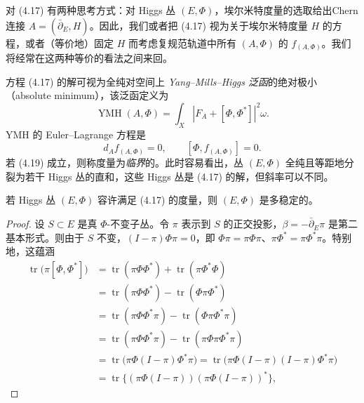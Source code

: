 对 (4.17) 有两种思考方式：对 Higgs 丛 $(E,\Phi)$，埃尔米特度量的选取给出Chern 连接 $A=(\bar\partial_E,H)$。因此，我们或者把 (4.17) 视为关于埃尔米特度量 $H$ 的方程，或者（等价地）固定 $H$ 而考虑复规范轨道中所有 $(A,\Phi)$ 的 $f_{(A,\Phi)}$。我们将经常在这两种等价的看法之间来回。

方程 (4.17) 的解可视为全纯对空间上 \emph{Yang--Mills--Higgs 泛函}的绝对极小（absolute minimum），该泛函定义为
\begin{equation}
\operatorname{YMH}(A,\Phi)=\int_X|F_A+[\Phi,\Phi^*]|^2\omega.
\label{eq:4.18}\tag{4.18}
\end{equation}
YMH 的 Euler--Lagrange 方程是
\begin{equation}
d_Af_{(A,\Phi)}=0,\qquad[\Phi,f_{(A,\Phi)}]=0.
\label{eq:4.19}\tag{4.19}
\end{equation}
若 (4.19) 成立，则称度量为\emph{临界}的。此时容易看出，丛 $(E,\Phi)$ 全纯且等距地分裂为若干 Higgs 丛的直和，这些 Higgs 丛是 (4.17) 的解，但斜率可以不同。

\begin{proposition}\label{prop:4.2.16}
若 Higgs 丛 $(E,\Phi)$ 容许满足 (4.17) 的度量，则 $(E,\Phi)$ 是多稳定的。
\end{proposition}

\begin{proof}
设 $S\subset E$ 是真 $\Phi$-不变子丛。令 $\pi$ 表示到 $S$ 的正交投影，$\beta=-\bar\partial_E\pi$ 是第二基本形式。则由于 $S$ 不变，$(I-\pi)\Phi\pi=0$，即 $\Phi\pi=\pi\Phi\pi$、$\pi\Phi^*=\pi\Phi^*\pi$。特别地，这蕴涵
\begin{align*}
\operatorname{tr}\bigl(\pi[\Phi,\Phi^*]\bigr)&=\operatorname{tr}(\pi\Phi\Phi^*)+\operatorname{tr}(\pi\Phi^*\Phi)\\
&=\operatorname{tr}(\pi\Phi\Phi^*)-\operatorname{tr}(\Phi\pi\Phi^*)\\
&=\operatorname{tr}(\pi\Phi\Phi^*\pi)-\operatorname{tr}(\Phi\pi\Phi^*\pi)\\
&=\operatorname{tr}(\pi\Phi\Phi^*\pi)-\operatorname{tr}(\pi\Phi\pi\Phi^*\pi)\\
&=\operatorname{tr}\bigl(\pi\Phi(I-\pi)\Phi^*\pi\bigr)=\operatorname{tr}\bigl(\pi\Phi(I-\pi)(I-\pi)\Phi^*\pi\bigr)\\
&=\operatorname{tr}\bigl\{(\pi\Phi(I-\pi))(\pi\Phi(I-\pi))^*\bigr\},
\end{align*}
\end{proof}

